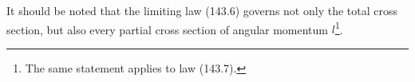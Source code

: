 It should be noted that the limiting law (143.6) governs not only the total cross section, but also every partial cross section of angular momentum $l$\footnote{The same statement applies to law (143.7).}.
